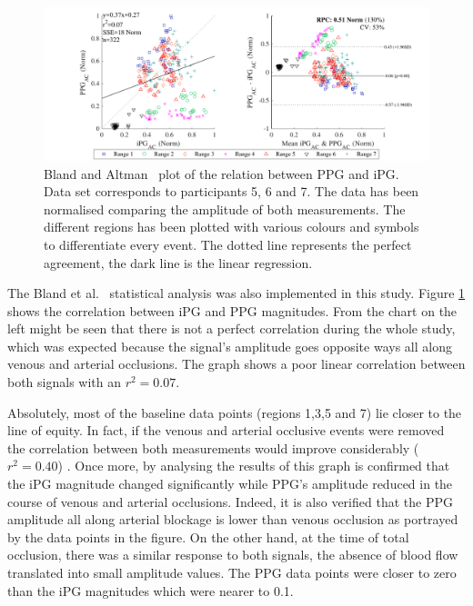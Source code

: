 \begin{figure}[!htpb]
	\includegraphics[width=1\textwidth,keepaspectratio]{figure3}    
	\caption[Bland and Altman plot of the relation between PPG and iPG]{Bland and Altman~\cite{bland1986statistical} plot of the relation between PPG and iPG. Data set corresponds to participants 5, 6 and 7. The data has been normalised comparing the amplitude of both measurements. The different regions has been plotted with various colours and symbols to differentiate every event. The dotted line represents the perfect agreement, the dark line is the linear regression.}
	\label{fig:corr RED}
\end{figure}

The Bland et al.~\cite{bland1986statistical} statistical analysis was also implemented in this study. Figure \ref{fig:corr RED} shows the correlation between iPG and PPG magnitudes. From the chart on the left might be seen that there is not a perfect correlation during the whole study, which was expected because the signal's amplitude goes opposite ways all along venous and arterial occlusions. The graph shows a poor linear correlation between both signals with an $r^2 = 0.07$.

Absolutely, most of the baseline data points (regions 1,3,5 and 7) lie closer to the line of equity. In fact, if the venous and arterial occlusive events were removed the correlation between both measurements would improve considerably ($r^2 = 0.40$) . Once more, by analysing the results of this graph is confirmed that the iPG magnitude changed significantly while PPG's amplitude reduced in the course of venous and arterial occlusions. Indeed, it is also verified that the PPG amplitude all along arterial blockage is lower than venous occlusion as portrayed by the data points in the figure. On the other hand, at the time of total occlusion, there was a similar response to both signals, the absence of blood flow translated into small amplitude values. The PPG data points were closer to zero than the iPG magnitudes which were nearer to \num{0.1}.

